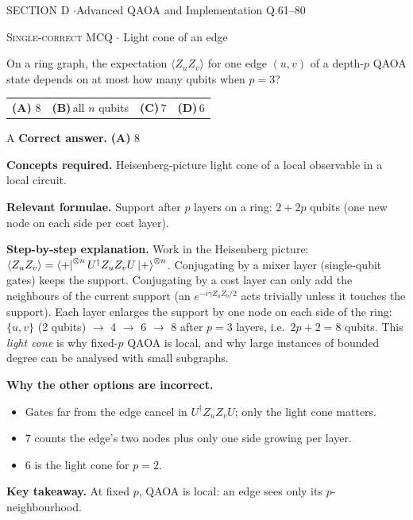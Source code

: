 \documentclass[11pt,a4paper]{article}
\newcommand{\optlabel}[1]{\textbf{(#1)}}
\newcommand{\correctlabel}[1]{\textcolor{okgreen}{\textbf{(#1)}\,\ding{51}}}
\newenvironment{qitem}[1]{\begin{list}{}{\setlength{\leftmargin}{3.3em}\setlength{\labelwidth}{3.1em}%
  \setlength{\labelsep}{0.2em}\setlength{\topsep}{3pt}\setlength{\parsep}{3pt}}\item[\textbf{Q.#1}\hfill]}{\end{list}}
\newcommand{\qsep}{\par\vspace{2pt}{\color{black!15}\hrule}\vspace{4pt}}
\newcommand{\qmeta}[2]{{\footnotesize\color{black!60}\textsc{#1} \;$\cdot$\; #2}\par}
\begin{document}
\newpage

\begin{sectionbanner}SECTION D \enspace$\cdot$\enspace Advanced QAOA and Implementation \hfill Q.61--80\end{sectionbanner}

\begin{qitem}{61}
\qmeta{Single-correct MCQ}{Light cone of an edge}
On a ring graph, the expectation $\langle Z_uZ_v\rangle$ for one edge $(u, v)$ of a depth-$p$ QAOA state depends on at most how
many qubits when $p = 3$?
\par\smallskip\noindent\begin{tabularx}{\linewidth}{@{}*{4}{L}@{}}
\correctlabel{A}\,$8$ & \optlabel{B}\,all $n$ qubits & \optlabel{C}\,$7$ & \optlabel{D}\,$6$
\end{tabularx}
\end{qitem}
\begin{solbox}{A}
\textbf{\color{brand}Correct answer.} \textcolor{okgreen}{\textbf{(A)}} $8$

\textbf{\color{brand}Concepts required.} Heisenberg-picture light cone of a local observable in a local circuit.

\textbf{\color{brand}Relevant formulae.} Support after $p$ layers on a ring: $2 + 2p$ qubits (one new node on each side per cost layer).

\textbf{\color{brand}Step-by-step explanation.} Work in the Heisenberg picture: $\langle Z_uZ_v\rangle = \bra{+}^{\otimes n}U^\dagger Z_uZ_vU\ket{+}^{\otimes n}$. Conjugating by a mixer layer
(single-qubit gates) keeps the support. Conjugating by a cost layer can only add the neighbours of the current support (an
$e^{-i\gamma Z_aZ_b/2}$ acts trivially unless it touches the support). Each layer enlarges the support by one node on each side
of the ring: $\{u, v\}$ (2 qubits) $\to$ 4 $\to$ 6 $\to$ 8 after $p = 3$ layers, i.e.\ $2p + 2 = 8$ qubits.
This \emph{light cone} is why fixed-$p$ QAOA is local, and why large instances of bounded degree can be analysed with small
subgraphs.

\textbf{\color{brand}Why the other options are incorrect.}
\begin{itemize}[leftmargin=2.4em, itemsep=1pt, topsep=2pt]
\item[\textbf{(B)}] Gates far from the edge cancel in $U^\dagger Z_uZ_vU$; only the light cone matters.
\item[\textbf{(C)}] $7$ counts the edge's two nodes plus only one side growing per layer.
\item[\textbf{(D)}] $6$ is the light cone for $p = 2$.
\end{itemize}
\textbf{\color{brand}Key takeaway.} At fixed $p$, QAOA is local: an edge sees only its $p$-neighbourhood.
\end{solbox}
\qsep
\end{document}
